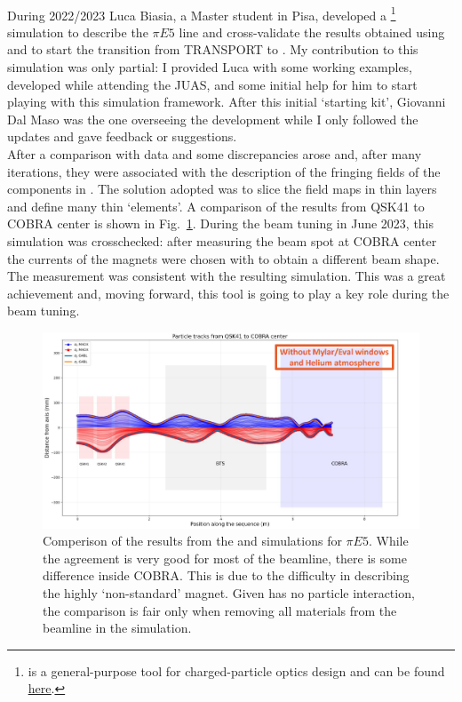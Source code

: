 \begin{refsection}
        \paragraph{\madx} During 2022/2023 Luca Biasia, a Master student in Pisa, developed a \madx\footnote{\madx is a general-purpose tool for charged-particle optics design and can be found \href{http://madx.web.cern.ch/madx/}{\underline{here}}.} simulation to describe the $\pi E5$ line and cross-validate the results obtained using \gfb and to start the transition from TRANSPORT to \madx.        
        My contribution to this simulation was only partial: I provided Luca with some working \madx examples, developed while attending the JUAS, and some initial help for him to start playing with this simulation framework. 
        After this initial `starting kit', Giovanni Dal Maso was the one overseeing the development while I only followed the updates and gave feedback or suggestions. \\
        After a comparison with data and \gfb some discrepancies arose and, after many iterations, they were associated with the description of the fringing fields of the components in \madx. 
        The solution adopted was to slice the field maps in thin layers and define many thin `\madx elements'. 
        A comparison of the results from QSK41 to COBRA center is shown in Fig.~\ref{fig:madx_vs_g4b}.
        During the beam tuning in June 2023, this simulation was crosschecked: after measuring the beam spot at COBRA center the currents of the magnets were chosen with \madx to obtain a different beam shape. 
        The measurement was consistent with the resulting simulation.
        This was a great achievement and, moving forward, this tool is going to play a key role during the beam tuning.

        \begin{figure}
            \centering
            \includegraphics[width = \textwidth]{Figures/MEG/madx_vs_g4b.png}
            \caption{Comperison of the results from the \gfb and \madx simulations for $\pi E5$. While the agreement is very good for most of the beamline, there is some difference inside COBRA. This is due to the difficulty in describing the highly `non-standard' magnet. Given \madx has no particle interaction, the comparison is fair only when removing all materials from the beamline in the \gfb simulation.}
            \label{fig:madx_vs_g4b}
        \end{figure}


\end{refsection}
